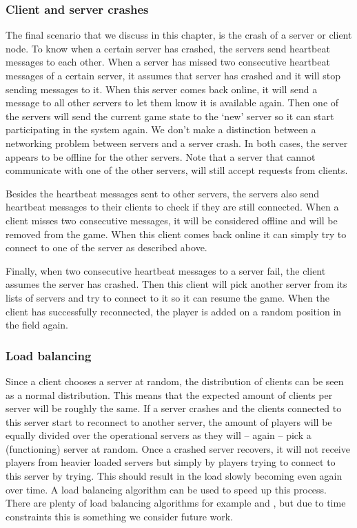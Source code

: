 \subsubsection{Client and server crashes}
\label{subsubsec:client_server_crashes}
The final scenario that we discuss in this chapter, is the crash of a server or client node. 
To know when a certain server has crashed, the servers send heartbeat messages to each other. 
When a server has missed two consecutive heartbeat messages of a certain server, it assumes that server has crashed and it will stop sending messages to it.
When this server comes back online, it will send a message to all other servers to let them know it is available again. 
Then one of the servers will send the current game state to the `new' server so it can start participating in the system again.
We don't make a distinction between a networking problem between servers and a server crash. 
In both cases, the server appears to be offline for the other servers. 
Note that a server that cannot communicate with one of the other servers, will still accept requests from clients.

Besides the heartbeat messages sent to other servers, the servers also send heartbeat messages to their clients to check if they are still connected. 
When a client misses two consecutive messages, it will be considered offline and will be removed from the game.
When this client comes back online it can simply try to connect to one of the server as described above.

Finally, when two consecutive heartbeat messages to a server fail, the client assumes the server has crashed. 
Then this client will pick another server from its lists of servers and try to connect to it so it can resume the game. 
When the client has successfully reconnected, the player is added on a random position in the field again.

\subsubsection{Load balancing}
\label{subsubsec:load_balancing}
	Since a client chooses a server at random, the distribution of clients can be seen as a normal distribution. 
	This means that the expected amount of clients per server will be roughly the same.
	If a server crashes and the clients connected to this server start to reconnect to another server, the amount of players will be equally divided over the operational servers as they will -- again -- pick a (functioning) server at random.
	Once a crashed server recovers, it will not receive players from heavier loaded servers but simply by players trying to connect to this server by trying. 
	This should result in the load slowly becoming even again over time. 
	A load balancing algorithm can be used to speed up this process.
	There are plenty of load balancing algorithms for example \cite{wolff2001dynamic} and \cite{ballard2000client}, but due to time constraints this is something we consider future work.

